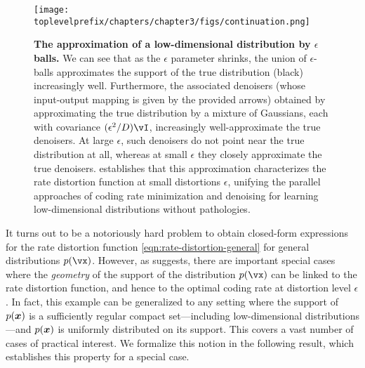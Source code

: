 \documentclass[../../book-main.tex]{subfiles}
\begin{document}
\begin{figure}[t]
	\centering 
	\texttt{[image: \\toplevelprefix/chapters/chapter3/figs/continuation.png]}
	\caption{\small\textbf{The approximation of a low-dimensional distribution
	by \(\epsilon\) balls.} We can see that as the \(\epsilon\) parameter
	shrinks, the union of \(\epsilon\)-balls approximates the support of the
	true distribution (black) increasingly well. Furthermore, the associated
	denoisers (whose input-output mapping is given by the provided arrows)
	obtained by approximating the true distribution by a mixture of Gaussians,
	each with covariance \((\epsilon^{2}/D)\vI\), increasingly well-approximate
	the true denoisers. At large \(\epsilon\), such denoisers do not point near
	the true distribution at all, whereas at small \(\epsilon\) they closely
	approximate the true denoisers. 
	establishes that this approximation characterizes the rate distortion
	function at small distortions $\epsilon$, unifying the parallel approaches
	of coding rate minimization and denoising for learning low-dimensional
	distributions without pathologies.}
	\label{fig:continuation}
\end{figure}

It turns out to be a notoriously hard problem to obtain closed-form expressions
for the rate distortion function \eqref{eqn:rate-distortion-general} for general
distributions $p(\vx)$. However, as
 suggests, there are important
special cases where the \textit{geometry} of the support of the distribution
$p(\vx)$ can be linked to the rate distortion function, and hence to the optimal
coding rate at distortion level $\epsilon$.
In fact, this example can be generalized to any setting where the
support of $p(\bm{x})$ is a sufficiently regular compact set---including
low-dimensional distributions---and $p(\bm{x})$ is uniformly distributed on its
support.
This covers a vast number of cases of practical interest.
We formalize this notion in the following result, which establishes this
property for a special case.


%
\end{document}

